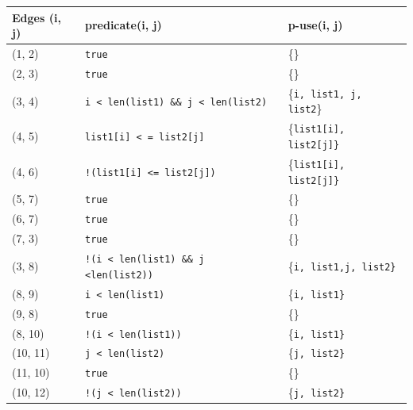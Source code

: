 \documentclass[11pt, oneside]{article}   	%
\begin{document}
\begin{table}[H]
	\begin{tabular}{|l|l|l|}
		\hline
		Edges (i, j) & predicate(i, j)                                                  & p-use(i, j)                             \\ \hline
		(1, 2)       & \texttt{true}                                                    & \{\}                                    \\ \hline
		(2, 3)       & \texttt{true}                                                    & \{\}                                    \\ \hline
		(3, 4)       & \texttt{i \textless \ len(list1) \&\& j \textless\  len(list2)}  & \{\texttt{i, list1, j, list2}\}         \\ \hline
		(4, 5)       & \texttt{list1{[}i{]} \textless \ {}= list2{[}j{]} }              & \{\texttt{list1{[}i{]}, list2{[}j{]}\}} \\ \hline
		(4, 6)       & \texttt{!(list1{[}i{]} \textless{}= list2{[}j{]})}               & \{\texttt{list1{[}i{]}, list2{[}j{]}\}} \\ \hline
		(5, 7)       & \texttt{true}                                                    & \{\}                                    \\ \hline
		(6, 7)       & \texttt{true}                                                    & \{\}                                    \\ \hline
		(7, 3)       & \texttt{true}                                                    & \{\}                                    \\ \hline
		(3, 8)       & \texttt{!(i \textless \ len(list1) \&\& j \textless len(list2))} & \{\texttt{i, list1,j, list2\}}          \\ \hline
		(8, 9)       & \texttt{i \textless \ len(list1)}                                & \{\texttt{i, list1\}}                   \\ \hline
		(9, 8)       & \texttt{true}                                                    & \{\}                                    \\ \hline
		(8, 10)      & \texttt{!(i \textless \ len(list1))}                             & \{\texttt{i, list1\}}                   \\ \hline
		(10, 11)     & \texttt{j \textless \ len(list2)}                                & \{\texttt{j, list2\}}                   \\ \hline
		(11, 10)     & \texttt{true}                                                    & \{\}                                    \\ \hline
		(10, 12)     & \texttt{!(j \textless \ len(list2))}                             & \{\texttt{j, list2\}}                   \\ \hline
	\end{tabular}
\end{table}
\end{document}
